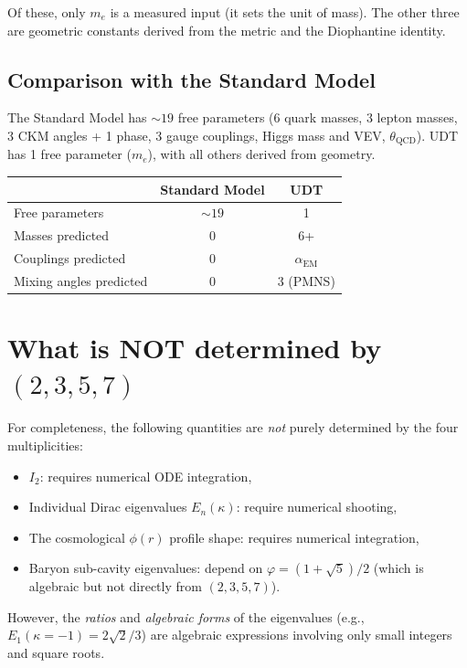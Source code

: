 \documentclass[11pt,letterpaper]{article}
\numberwithin{equation}{section}
\begin{document}
Of these, only $m_e$ is a measured input (it sets the unit of mass).
The other three are geometric constants derived from the metric and
the Diophantine identity.

\subsection{Comparison with the Standard Model}

The Standard Model has $\sim 19$ free parameters (6 quark masses, 3 lepton
masses, 3 CKM angles + 1 phase, 3 gauge couplings, Higgs mass and VEV,
$\theta_\mathrm{QCD}$). UDT has 1 free parameter ($m_e$), with all others
derived from geometry.

\begin{center}
\begin{tabular}{lcc}
\toprule
 & Standard Model & UDT \\
\midrule
Free parameters & $\sim 19$ & 1 \\
Masses predicted & 0 & 6+ \\
Couplings predicted & 0 & $\alpha_\mathrm{EM}$ \\
Mixing angles predicted & 0 & 3 (PMNS) \\
\bottomrule
\end{tabular}
\end{center}

\section{What is NOT determined by $(2,3,5,7)$}
\label{sec:not_determined}

For completeness, the following quantities are \emph{not} purely determined
by the four multiplicities:
\begin{itemize}
  \item $I_2$: requires numerical ODE integration,
  \item Individual Dirac eigenvalues $E_n(\kappa)$: require numerical shooting,
  \item The cosmological $\phi(r)$ profile shape: requires numerical integration,
  \item Baryon sub-cavity eigenvalues: depend on $\varphi = (1+\sqrt{5})/2$
    (which is algebraic but not directly from $(2,3,5,7)$).
\end{itemize}

However, the \emph{ratios} and \emph{algebraic forms} of the eigenvalues
(e.g., $E_1(\kappa=-1) = 2\sqrt{2}/3$) are algebraic expressions involving
only small integers and square roots.
\end{document}
